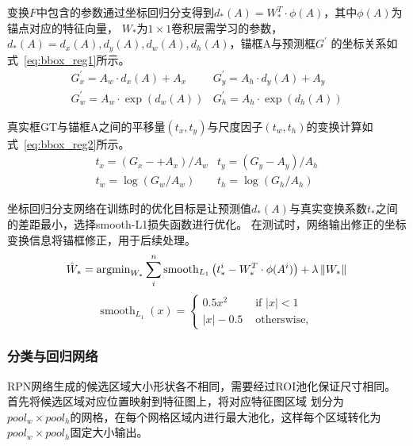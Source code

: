变换$F$中包含的参数通过坐标回归分支得到$d_{*}(A)=W_{*}^{T} \cdot \phi(A)$，其中$\phi(A)$为锚点对应的特征向量，
$W_{*}$为$1\times1$卷积层需学习的参数，$d_{*}(A)=d_{x}(A), d_{y}(A), d_{w}(A), d_{h}(A)$，锚框A与预测框$G^{\prime}$
的坐标关系如式~\ref{eq:bbox_reg1}所示。
\begin{equation}
  \begin{array}{cc}
    G_{x}^{\prime} =A_{w} \cdot d_{x}(A)+A_{x} & G_{y}^{\prime} = A_{h} \cdot d_{y}(A)+A_{y} \\
    G_{w}^{\prime} =A_{w} \cdot \exp \left(d_{w}(A)\right) & G_{h}^{\prime} =A_{h} \cdot \exp \left(d_{h}(A)\right)
  \end{array}
  \label{eq:bbox_reg1}
\end{equation}

真实框GT与锚框A之间的平移量$(t_{x}, t_{y})$与尺度因子$(t_{w}, t_{h})$的变换计算如式~\ref{eq:bbox_reg2}所示。
\begin{equation}
  \begin{array}{cc}
    t_{x}=\left(G_{x}-+A_{x}\right) / A_{w} & t_{y}=\left(G_{y}-A_{y}\right) / A_{h} \\
    t_{w}=\log \left(G_{w} / A_{w}\right) & t_{h}=\log \left(G_{h} / A_{h}\right)
  \end{array}
  \label{eq:bbox_reg2}
\end{equation}

坐标回归分支网络在训练时的优化目标是让预测值$d_{*}(A)$与真实变换系数$t_{*}$之间的差距最小，选择smooth-L1损失函数进行优化。
在测试时，网络输出修正的坐标变换信息将锚框修正，用于后续处理。
\begin{equation}
  {\hat W_*} = {{\mathop{\rm argmin}\nolimits} _{{W_*}}}\sum\limits_i^n {{{{\mathop{\rm smooth}\nolimits} }_{{L_1}}}
  \left( {t_*^i - W_*^T \cdot \phi ({A^i})} \right)}  + \lambda \left\| {{W_*}} \right\|
  \label{eq:bbox_reg3}
\end{equation}
\begin{equation}
  \operatorname{smooth}_{L_{1}}(x)
  =\left\{\begin{array}{rr} 0.5 x^{2} & \text { if }|x|<1 \\ |x|-0.5 & \text { otherswise, } \end{array}\right.
  \label{eq:bbox_reg4}
\end{equation}

\subsubsection{分类与回归网络}
RPN网络生成的候选区域大小形状各不相同，需要经过ROI池化保证尺寸相同。首先将候选区域对应位置映射到特征图上，将对应特征图区域
划分为$pool_w \times pool_h$的网格，在每个网格区域内进行最大池化，这样每个区域转化为$pool_w \times pool_h$固定大小输出。

